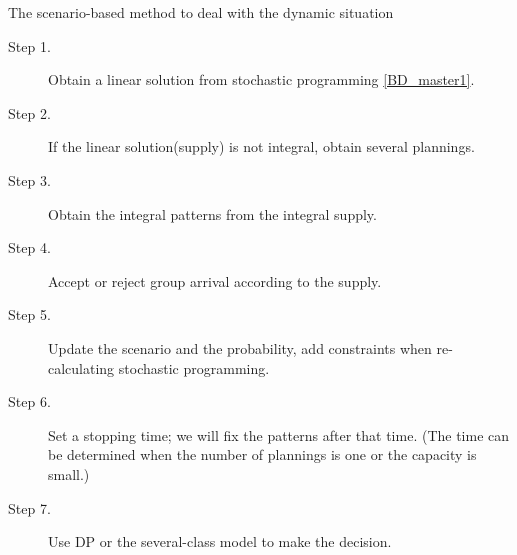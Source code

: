 
\begin{algorithm}[H]\label{scenario_based}
  \caption{The scenario-based method to deal with the dynamic situation}
  \begin{description}
    \item[Step 1.] Obtain a linear solution from stochastic programming \eqref{BD_master1}.
    \item[Step 2.] If the linear solution(supply) is not integral, obtain several plannings.
    \item[Step 3.] Obtain the integral patterns from the integral supply.
    \item[Step 4.] Accept or reject group arrival according to the supply.
    \item[Step 5.] Update the scenario and the probability, add constraints when re-calculating stochastic programming.
    \item[Step 6.] Set a stopping time; we will fix the patterns after that time. (The time can be determined when the number of plannings is one or the capacity is small.)
    \item[Step 7.] Use DP or the several-class model to make the decision.
  \end{description}
\end{algorithm}

